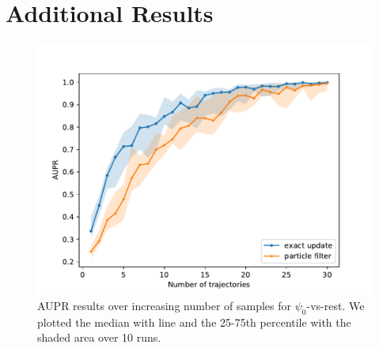 \chapter{Additional Results}
\begin{figure}[H]
	\begin{center}
		\includegraphics[width=.75\textwidth]{figures/roc_analysis/AUPR_perc_0}
		\caption[AUPR results over increasing number of samples]{AUPR results over increasing number of samples for $ \psi_0 $-vs-rest. We plotted the median with line and the 25-75th percentile with the shaded area over 10 runs.}
		\label{fig:AUPR_class0}
	\end{center}
\end{figure}
